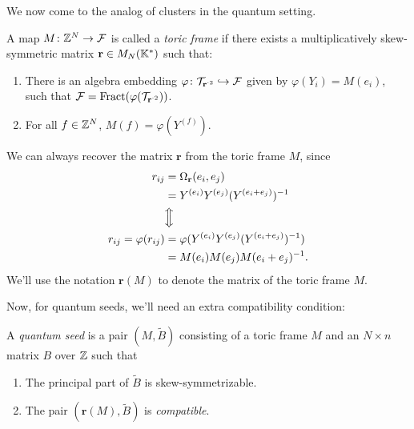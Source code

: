 \documentclass{article}
\newcommand{\tB}{\tilde{B}}
\DeclareMathOperator{\Fract}{Fract}
\begin{document}
We now come to the analog of clusters in the quantum setting.
\begin{definition}
	A map $M \colon \mathbb{Z}^N \to \mathcal{F}$ is called a \emph{toric frame} if there exists
	a multiplicatively skew-symmetric matrix $\mathbf{r} \in M_N(\mathbb{K}^*)$ such that:
	\begin{enumerate}
		\item There is an algebra embedding $\varphi \colon \mathcal{T}_{\mathbf{r}^{\cdot 2}} \hookrightarrow \mathcal{F}$
		      given by $\varphi(Y_i) = M(e_i)$, such that $\mcF =
			      \Fract(\varphi(\mcT_{\mathbf{r}^{\cdot 2}}))$.
		\item For all $f \in \mathbb{Z}^N$, $M(f) = \varphi(Y^{(f)})$.
	\end{enumerate}
\end{definition}
\begin{remark}
	We can always recover the matrix $\mathbf{r}$ from the toric frame $M$,
	since
	\begin{align*}
		r_{ij}
		                         & = \Omega_{\mathbf{r}}(e_i, e_j)                    \\
		                         & = Y^{(e_i)}Y^{(e_j)}(Y^{(e_i + e_j)})^{-1}          \\
		                         & \Big\Updownarrow                                   \\
		r_{ij} = \varphi(r_{ij}) & = \varphi(Y^{(e_i)}Y^{(e_j)}(Y^{(e_i + e_j)})^{-1}) \\
		                         & = M(e_i)M(e_j)M(e_i + e_j)^{-1}.
	\end{align*}
	We'll use the notation $\mathbf{r}(M)$ to denote the matrix of the toric frame $M$.
\end{remark}
Now, for quantum seeds, we'll need an extra compatibility condition:
\begin{definition}
	A \emph{quantum seed} is a pair $(M, \tB)$ consisting of a toric frame $M$
	and an $N \times n$ matrix $B$ over $\mathbb{Z}$ such that
	\begin{enumerate}
		\item The principal part of $\tB$ is skew-symmetrizable.
		\item The pair $(\mathbf{r}(M), \tB)$ is \emph{compatible}.
	\end{enumerate}
\end{definition}
\end{document}
